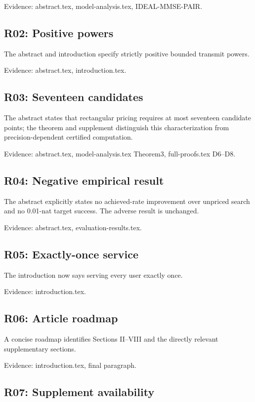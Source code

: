 \documentclass[10pt]{article}
\begin{document}
{\small Evidence: abstract.tex, model-analysis.tex, IDEAL-MMSE-PAIR.}

\subsection*{R02: Positive powers}

The abstract and introduction specify strictly positive bounded transmit powers.

{\small Evidence: abstract.tex, introduction.tex.}

\subsection*{R03: Seventeen candidates}

The abstract states that rectangular pricing requires at most seventeen candidate points; the theorem and supplement distinguish this characterization from precision-dependent certified computation.

{\small Evidence: abstract.tex, model-analysis.tex Theorem3, full-proofs.tex D6--D8.}

\subsection*{R04: Negative empirical result}

The abstract explicitly states no achieved-rate improvement over unpriced search and no 0.01-nat target success. The adverse result is unchanged.

{\small Evidence: abstract.tex, evaluation-results.tex.}

\subsection*{R05: Exactly-once service}

The introduction now says serving every user exactly once.

{\small Evidence: introduction.tex.}

\subsection*{R06: Article roadmap}

A concise roadmap identifies Sections II--VIII and the directly relevant supplementary sections.

{\small Evidence: introduction.tex, final paragraph.}

\subsection*{R07: Supplement availability}
\end{document}
